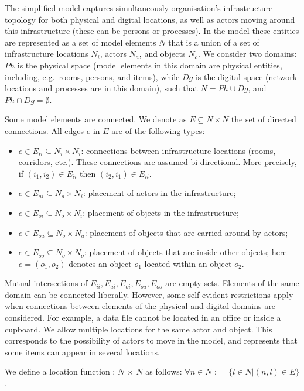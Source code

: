 \documentclass{llncs}
\begin{document}
The simplified model captures simultaneously organisation's infrastructure topology for both physical and digital locations, as well as actors moving around this infrastructure (these can be persons or processes).  In the model these entities are represented as a set of model elements $N$ that is a union of a set of infrastructure locations $N_i$, actors $N_a$, and objects $N_o$. We consider two domains: $Ph$ is the physical space (model elements in this domain are physical entities, including, e.g.\ rooms, persons, and items), while $Dg$ is the digital space (network locations and processes are in this domain), such that $N = Ph \cup Dg$, and $Ph \cap Dg = \emptyset$. 


Some model elements are connected. We denote as $E \subseteq N \times N$ the set of directed connections. All edges $e$ in $E$ are of the following types:
\begin{itemize}
\item $e \in E_{ii} \subseteq N_i \times N_i$: connections between infrastructure locations (rooms, corridors, etc.). These connections are assumed bi-directional. More precisely, if $(i_1,i_2) \in E_{ii}$ then $(i_2,i_1) \in E_{ii}$.
\item $e \in E_{ai} \subseteq N_a \times N_i$: placement of actors in the infrastructure; 	
\item $e \in E_{oi} \subseteq N_o \times N_i$: placement of objects in the infrastructure;
\item $e \in E_{oa} \subseteq N_o \times N_a$: placement of objects that are carried around by actors; 
\item $e \in E_{oo} \subseteq N_o \times N_o$: placement of objects that are inside other objects; here $e = (o_1, o_2)$ denotes an object $o_1$ located within an object $o_2$.
\end{itemize}
Mutual intersections of $E_{ii}, E_{ai}, E_{oi}, E_{oa}, E_{oo}$ are empty sets. Elements of the same domain can be connected liberally. However, some self-evident restrictions apply when connections between elements of the physical and digital domains are considered. For example, a data file cannot be located in an office or inside a cupboard. We allow multiple locations for the same actor and object. This corresponds to the possibility of actors to move in the model, and represents that some items can appear in several locations. 

We define a location function \loc{}: $N$ $\times$ $N$ as follows: 
$\forall n \in N $ : = $\{ l \in N | (n, l) \in E \}$.
\end{document}
